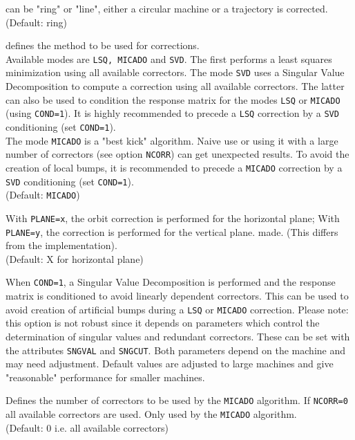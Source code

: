\begin{madlist}
    can be "ring" or "line", either a circular machine
     or a trajectory is corrected.   
     \\ (Default: ring) 

    defines the method to be used for corrections. 
     \\ Available modes are {\tt LSQ, MICADO} and {\tt SVD}.  
     The first performs a
     least squares minimization using all available correctors. The mode
     {\tt SVD} uses a Singular Value Decomposition to compute a correction
     using all available correctors. The latter can also be used to
     condition the response matrix for the modes {\tt LSQ} or {\tt MICADO} (using
     {\tt COND=1}). It is highly recommended to precede a {\tt LSQ} correction by a
     {\tt SVD} conditioning (set {\tt COND=1}).  
     \\ The mode {\tt MICADO} is a "best kick" algorithm. Naive use or using
     it with a large number of correctors (see option {\tt NCORR}) can get
     unexpected results. To avoid the creation of local bumps, it is
     recommended to precede a {\tt MICADO} correction by a {\tt SVD} conditioning
     (set {\tt COND=1}).  
     \\ (Default: {\tt MICADO})

    With {\tt PLANE=x}, the orbit correction
     is performed for the horizontal plane; With {\tt PLANE=y}, 
     the correction is performed for the vertical plane. made. (This
     differs from the \madeight implementation).  
     \\ (Default: X for horizontal plane) 

    When {\tt COND=1}, a Singular Value Decomposition is
     performed and  the response matrix is conditioned to avoid linearly
     dependent correctors. This can be used to avoid creation of
     artificial bumps during a {\tt LSQ} or {\tt MICADO} correction.  
     Please note: this option is not robust since it
     depends on parameters which control the determination of singular
     values and redundant correctors. These can be set with the attributes
     {\tt SNGVAL} and {\tt SNGCUT}. Both parameters depend on the machine and may
     need adjustment. Default values are adjusted to large machines and give
     "reasonable" performance for smaller machines.

    Defines the number of correctors to be used by the 
     {\tt MICADO} algorithm. If {\tt NCORR=0} all available
     correctors are used. Only used by the {\tt MICADO} algorithm.
     \\ (Default: 0 i.e. all available correctors)


\end{madlist}
